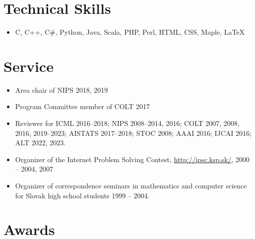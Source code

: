\documentclass[9pt]{article}
\begin{document}
\section*{Technical Skills}

\begin{itemize}
\item C, C++, C\#, Python, Java, Scala, PHP, Perl, HTML, CSS, Maple, LaTeX
\end{itemize}

\section*{Service}

\begin{itemize}
\item Area chair of NIPS 2018, 2019
\item Program Committee member of COLT 2017
\item Reviewer for ICML 2016--2018; NIPS 2008--2014, 2016; COLT 2007, 2008, 2016, 2019--2023; AISTATS 2017--2018; STOC 2008; AAAI 2016; IJCAI 2016; ALT 2022, 2023.
\item Organizer of the Internet Problem Solving Contest, \url{http://ipsc.ksp.sk/}, 2000 -- 2004, 2007
\item Organizer of correspondence seminars in mathematics and computer science for Slovak high school students 1999 -- 2004.
\end{itemize}

\section*{Awards}
\end{document}
